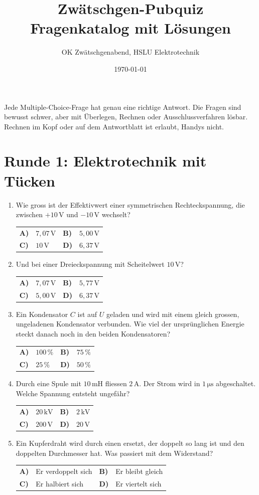 \documentclass[a4paper,11pt]{article}
\title{\textcolor{zwetschge}{\textbf{Zwätschgen-Pubquiz}}\\[0.3em]\large Fragenkatalog\ifloesung{} mit Lösungen\fi}
\author{OK Zwätschgenabend, HSLU Elektrotechnik}
\date{\today}
\makeatletter
\newif\ifloesung
\newcommand{\loesung}[1]{\ifloesung\par\smallskip\noindent\textcolor{zwetschge}{\textbf{Lösung:} #1}\fi}
\newcommand{\mc}[6]{%
  \item #1\par\nopagebreak\smallskip
  \noindent\begin{tabularx}{\linewidth}{@{}>{\bfseries}l X >{\bfseries}l X@{}}
    A) & #2 & B) & #3 \\[0.25em]
    C) & #4 & D) & #5
  \end{tabularx}%
  \loesung{#6}}
\newcommand{\runde}[2]{\section{Runde #1: #2}}
\makeatother
\begin{document}
\maketitle
\thispagestyle{fancy}

\noindent Jede Multiple-Choice-Frage hat genau eine richtige Antwort. Die Fragen sind bewusst schwer, aber mit Überlegen, Rechnen oder Ausschlussverfahren lösbar. Rechnen im Kopf oder auf dem Antwortblatt ist erlaubt, Handys nicht.

\runde{1}{Elektrotechnik mit Tücken}
\begin{enumerate}
  \mc{Wie gross ist der Effektivwert einer symmetrischen Rechteckspannung, die zwischen $+10\,\mathrm{V}$ und $-10\,\mathrm{V}$ wechselt?}
     {$7{,}07\,\mathrm{V}$}{$5{,}00\,\mathrm{V}$}{$10\,\mathrm{V}$}{$6{,}37\,\mathrm{V}$}
     {C. Der Betrag ist immer $10\,\mathrm{V}$, also ist auch der Effektivwert $10\,\mathrm{V}$. $7{,}07\,\mathrm{V}$ gilt nur für den Sinus.}

  \mc{Und bei einer Dreieckspannung mit Scheitelwert $10\,\mathrm{V}$?}
     {$7{,}07\,\mathrm{V}$}{$5{,}77\,\mathrm{V}$}{$5{,}00\,\mathrm{V}$}{$6{,}37\,\mathrm{V}$}
     {B. $\hat{u}/\sqrt{3} \approx 5{,}77\,\mathrm{V}$.}

  \mc{Ein Kondensator $C$ ist auf $U$ geladen und wird mit einem gleich grossen, ungeladenen Kondensator verbunden. Wie viel der ursprünglichen Energie steckt danach noch in den beiden Kondensatoren?}
     {$100\,\%$}{$75\,\%$}{$25\,\%$}{$50\,\%$}
     {D. Die Ladung verteilt sich, beide haben $U/2$. Energie: $2 \cdot \tfrac{1}{2}C(U/2)^2 = \tfrac{1}{4}CU^2$, also die Hälfte. Der Rest geht im Widerstand oder Funken verloren, unabhängig davon, wie klein er ist.}

  \mc{Durch eine Spule mit $10\,\mathrm{mH}$ fliessen $2\,\mathrm{A}$. Der Strom wird in $1\,\mathrm{\mu s}$ abgeschaltet. Welche Spannung entsteht ungefähr?}
     {$20\,\mathrm{kV}$}{$2\,\mathrm{kV}$}{$200\,\mathrm{V}$}{$20\,\mathrm{V}$}
     {A. $u = L\,\Delta i/\Delta t = 10^{-2} \cdot 2 / 10^{-6} = 20\,\mathrm{kV}$. Deshalb gehört eine Freilaufdiode über jede Relaisspule.}

  \mc{Ein Kupferdraht wird durch einen ersetzt, der doppelt so lang ist und den doppelten Durchmesser hat. Was passiert mit dem Widerstand?}
     {Er verdoppelt sich}{Er bleibt gleich}{Er halbiert sich}{Er viertelt sich}
     {C. $R \sim l/A$: doppelte Länge und vierfache Fläche ergibt $2/4 = 1/2$.}


\end{enumerate}
\end{document}

